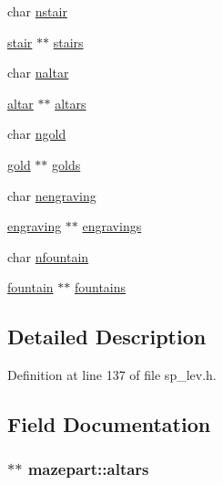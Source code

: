 \begin{DoxyCompactItemize}
\item 
char \hyperlink{structmazepart_ab55b7bf67af91db70d364ae2b44a2c6e}{nstair}
\item 
\hyperlink{structstair}{stair} $\ast$$\ast$ \hyperlink{structmazepart_a55d211fb57dc124f377703c23e75e7fa}{stairs}
\item 
char \hyperlink{structmazepart_a9dfb15fb25c3ef56505dd29d93eb0350}{naltar}
\item 
\hyperlink{structaltar}{altar} $\ast$$\ast$ \hyperlink{structmazepart_a502e1de534d0b25697239064415c3fac}{altars}
\item 
char \hyperlink{structmazepart_a8f27a2da143efd35e352cac20a3b075d}{ngold}
\item 
\hyperlink{structgold}{gold} $\ast$$\ast$ \hyperlink{structmazepart_aaaeaf28ca273f27168372458d5adf1c4}{golds}
\item 
char \hyperlink{structmazepart_a5dd30fd46e000cc79f68b955338ad893}{nengraving}
\item 
\hyperlink{structengraving}{engraving} $\ast$$\ast$ \hyperlink{structmazepart_a2eacbada43de2597cde686d73151b6d6}{engravings}
\item 
char \hyperlink{structmazepart_a8f959b454330e5b350ff3bdbdc135d36}{nfountain}
\item 
\hyperlink{structfountain}{fountain} $\ast$$\ast$ \hyperlink{structmazepart_af1aa16ce0bb42aaad6d3260cfe17f807}{fountains}
\end{DoxyCompactItemize}


\subsection{Detailed Description}


Definition at line 137 of file sp\+\_\+lev.\+h.



\subsection{Field Documentation}
\hypertarget{structmazepart_a502e1de534d0b25697239064415c3fac}{
\subsubsection[{altars}]{$\ast$$\ast$ mazepart\+::altars}}\label{structmazepart_a502e1de534d0b25697239064415c3fac}


